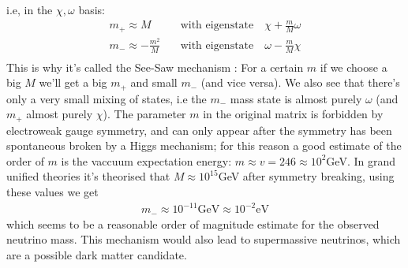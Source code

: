 \documentclass[11pt,a4paper,faculty=we,language=en,doctype=report]{cls/ugent-doc}
\begin{document}
i.e, in the $\chi,\omega$ basis:
\begin{align}
	m_+\approx M \quad &\text{with eigenstate} \quad \chi + \frac{m}{M}\omega\\
	m_-\approx -\frac{m^2}{M} \quad &\text{with eigenstate} \quad  \omega - \frac{m}{M}\chi\\
\end{align}
This is why it's called the  See-Saw mechanism : For a certain $m$ if we choose a big $M$ we'll
get a big $m_+$ and small $m_-$ (and vice versa). We also see that there's only
a very small mixing of states, i.e the $m_-$ mass state is almost purely
$\omega$ (and $m_+$ almost purely $\chi$). The parameter $m$ in the original
matrix is forbidden by electroweak gauge symmetry, and can only appear after
the symmetry has been spontaneous broken by a Higgs mechanism; for this reason
a good estimate of the order of $m$ is the vaccuum expectation energy:
$m\approx v = 246 \approx 10^2$GeV. In grand unified theories it's theorised
that $M\approx 10^{15}$GeV after symmetry breaking, using these values we get
\begin{align}
	m_- \approx 10^{-11}\text{GeV} \approx 10^{-2} \text{eV}
\end{align}
which seems \cite{neutrino-mass} to be a reasonable order of magnitude estimate for the observed neutrino
mass.
This mechanism would also lead to supermassive neutrinos, which are a possible dark matter
candidate.
\end{document}
